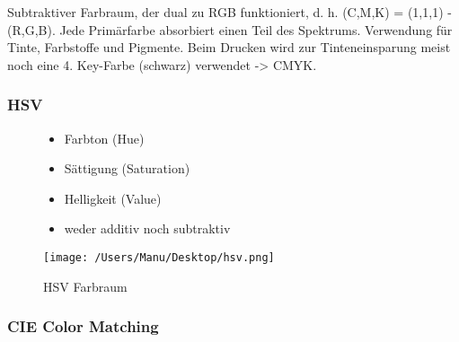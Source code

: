 \documentclass[paper=a4, fontsize=11pt]{scrartcl} %
\numberwithin{equation}{section} %
\numberwithin{figure}{section} %
\numberwithin{table}{section} %
\begin{document}
Subtraktiver Farbraum, der dual zu RGB funktioniert, d. h. (C,M,K) = (1,1,1) - (R,G,B). Jede Primärfarbe absorbiert einen Teil des Spektrums. Verwendung für Tinte, Farbstoffe und Pigmente. Beim Drucken wird zur Tinteneinsparung meist noch eine 4. Key-Farbe (schwarz) verwendet -> CMYK.

\subsubsection{HSV}

\begin{figure}[htbp]
\begin{minipage}[t]{6cm}
\vspace{0pt}
\begin{itemize}
\item Farbton (Hue)
\item Sättigung (Saturation) 
\item Helligkeit (Value)
\item weder additiv noch subtraktiv
\end{itemize}
\end{minipage}
\hfill
\begin{minipage}[t]{6cm}
\vspace{0pt}
\centering
\texttt{[image: /Users/Manu/Desktop/hsv.png]}
\caption{HSV Farbraum}
\label{fig:Bild1}
\end{minipage}
\end{figure}

\subsubsection{CIE Color Matching}
\end{document}
